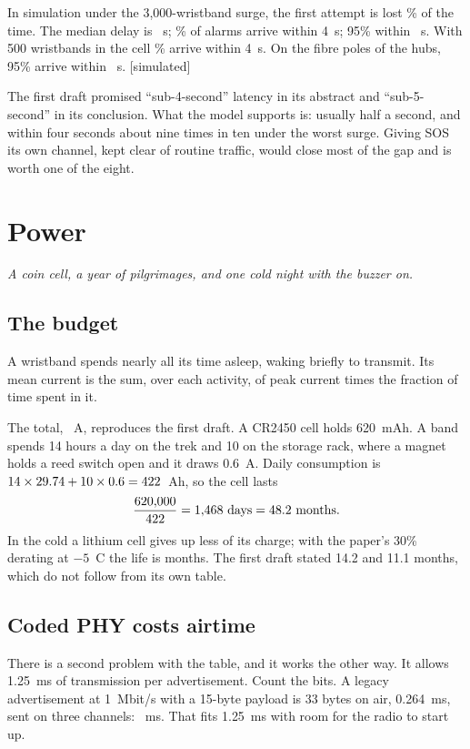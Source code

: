 \documentclass[11pt,a4paper,twoside,openany]{book}
\newcommand{\hook}[1]{{\noindent\fontsize{13}{19}\selectfont\itshape\color{rsmuted}#1\par}\vspace{12pt}}
\newcommand{\lbl}[1]{\textsf{\footnotesize\color{rsmuted}[#1]}}
\begin{document}
In simulation under the 3,000-wristband surge, the first attempt is lost \SosFirstLoss\% of the time. The median delay
is \SosMedian~s; \SosFour\% of alarms arrive within 4~s; 95\% within \SosPninefive~s. With 500 wristbands in the cell
\SosFourLow\% arrive within 4~s. On the fibre poles of the hubs, 95\% arrive within \SosFiberP~s. \lbl{simulated}

The first draft promised ``sub-4-second'' latency in its abstract and ``sub-5-second'' in its conclusion. What the
model supports is: usually half a second, and within four seconds about nine times in ten under the worst surge.
Giving SOS its own channel, kept clear of routine traffic, would close most of the gap and is worth one of the eight.

\chapter{Power}\label{ch:power}
\hook{A coin cell, a year of pilgrimages, and one cold night with the buzzer on.}
\section{The budget}
A wristband spends nearly all its time asleep, waking briefly to transmit. Its mean current is the sum, over each
activity, of peak current times the fraction of time spent in it.
\begin{table}[htb]\centering\footnotesize\caption{Current budget of the wristband, from the first draft's Table~V
(design values, to be re-derived for the chosen chip).}\TablePower\end{table}
The total, \Iactive~\textmu A, reproduces the first draft. A CR2450 cell holds 620~mAh. A band spends 14 hours a day on
the trek and 10 on the storage rack, where a magnet holds a reed switch open and it draws 0.6~\textmu A. Daily
consumption is $14\times29.74+10\times0.6=422$~\textmu Ah, so the cell lasts
\[\frac{620{,}000}{422}=1{,}468\ \text{days}=\LifeWarm\ \text{months}.\]
In the cold a lithium cell gives up less of its charge; with the paper's 30\% derating at $-5$~\textdegree C the life
is \LifeCold{} months. The first draft stated 14.2 and 11.1 months, which do not follow from its own table.

\section{Coded PHY costs airtime}
There is a second problem with the table, and it works the other way. It allows 1.25~ms of transmission per
advertisement. Count the bits. A legacy advertisement at 1~Mbit/s with a 15-byte payload is 33 bytes on air, 0.264~ms,
sent on three channels: \AdvOneM~ms. That fits 1.25~ms with room for the radio to start up.
\end{document}

